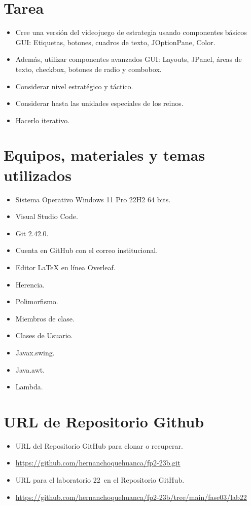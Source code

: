 \documentclass{article}
\newcommand{\itemPracticeNumber}{22}
\begin{document}

	\section{Tarea}
	\begin{itemize}		
        \item Cree una versión del videojuego de estrategia usando componentes básicos GUI: Etiquetas, botones, cuadros de texto, JOptionPane, Color.
        \item Además, utilizar componentes avanzados GUI: Layouts, JPanel, áreas de texto, checkbox, botones de radio y combobox.
        \item Considerar nivel estratégico y táctico.
        \item Considerar hasta las unidades especiales de los reinos.
        \item Hacerlo iterativo.
	\end{itemize}

\newpage

\section{Equipos, materiales y temas utilizados}
	\begin{itemize}
		\item Sistema Operativo Windows 11 Pro 22H2 64 bits.
		\item Visual Studio Code.
		\item Git 2.42.0.
		\item Cuenta en GitHub con el correo institucional.
        \item Editor LaTeX en línea Overleaf.
        \item Herencia.
        \item Polimorfismo.
        \item Miembros de clase.
        \item Clases de Usuario.
        \item Javax.swing.
        \item Java.awt.
        \item Lambda.
        
	\end{itemize}
	
\section{URL de Repositorio Github}
	\begin{itemize}
		\item URL del Repositorio GitHub para clonar o recuperar.
        \item \url{https://github.com/hernanchoquehuanca/fp2-23b.git}
		\item URL para el laboratorio \itemPracticeNumber\ en el Repositorio GitHub.
		\item \url{https://github.com/hernanchoquehuanca/fp2-23b/tree/main/fase03/lab22}
	\end{itemize}
\end{document}
